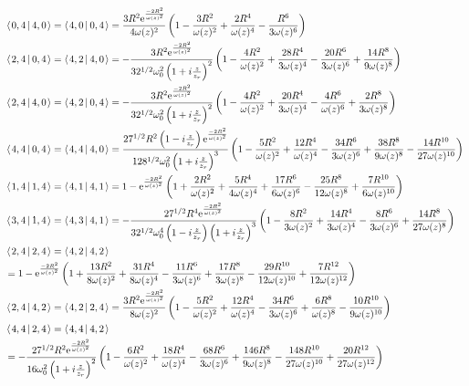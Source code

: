 \documentclass[11pt]{amsart}
\makeatletter
\newcommand{\e}{{\rm e}}				%
\newcommand{\msp}[1]{\mspace{#1mu}}		%
\newcommand{\0}{\varnothing}		%
\newcommand{\brac}[2]{\left\langle\msp{2} #1\left\lvert \msp{3.5} #2 \right.\right\rangle}	%
\newcommand{\1}{!}
\newcommand{\2}{@}
\newcommand{\3}{\#}
\newcommand{\4}{\$}
\newcommand{\5}{\%}
\newcommand{\6}{$^\wedge$}
\newcommand{\7}{\&}
\newcommand{\8}{*}
\newcommand{\9}{(}
\makeatother
\begin{document}
\begin{align*}
&\brac{0,4}{4,0} = \brac{4,0}{0,4} =\frac{3R^2\e^{\frac{-2R^2}{\omega(z)^2}}}{4\omega(z)^2}\left(1-\frac{3R^2}{\omega(z)^2}+\frac{2R^4}{\omega(z)^4}-\frac{R^6}{3\omega(z)^6}\right)
\\
&
\brac{2,4}{0,4} = \brac{4,2}{4,0} = -\frac{3R^2\e^{\frac{-2R^2}{\omega(z)^2}}}{32^{1/2}\omega_0^2\left(1+i\frac{z}{z_r}\right)^2}\left(1-\frac{4R^2}{\omega(z)^2}+\frac{28R^4}{3\omega(z)^4}-\frac{20R^6}{3\omega(z)^6}+\frac{14R^8}{9\omega(z)^8}\right)
\\
&
\brac{2,4}{4,0} = \brac{4,2}{0,4} = -\frac{3R^2\e^{\frac{-2R^2}{\omega(z)^2}}}{32^{1/2}\omega_0^2\left(1+i\frac{z}{z_r}\right)^2}\left(1-\frac{4R^2}{\omega(z)^2}+\frac{20R^4}{3\omega(z)^4}-\frac{4R^6}{\omega(z)^6}+\frac{2R^8}{3\omega(z)^8}\right)
\\
&
\brac{4,4}{0,4} = \brac{4,4}{4,0} = \frac{27^{1/2}R^2\left(1-i\frac{z}{z_r}\right)\e^{\frac{-2R^2}{\omega(z)^2}}}{128^{1/2}\omega_0^2\left(1+i\frac{z}{z_r}\right)^3}\left(1-\frac{5R^2}{\omega(z)^2}+\frac{12R^4}{\omega(z)^4}-\frac{34R^6}{3\omega(z)^6}+\frac{38R^8}{9\omega(z)^8}-\frac{14R^{10}}{27\omega(z)^{10}}\right)
\\
&
\brac{1,4}{1,4} = \brac{4,1}{4,1} = 1-\e^{\frac{-2R^2}{\omega(z)^2}}\left(1+\frac{2R^2}{\omega(z)^2}+\frac{5R^4}{4\omega(z)^4}+\frac{17R^6}{6\omega(z)^6}-\frac{25R^8}{12\omega(z)^8}+\frac{7R^{10}}{6\omega(z)^{10}}\right)
 \\
 &
 \brac{3,4}{1,4} = \brac{4,3}{4,1} = -\frac{27^{1/2}R^4\e^{\frac{-2R^2}{\omega(z)^2}}}{32^{1/2}\omega_0^4\left(1-i\frac{z}{z_r}\right)\left(1+i\frac{z}{z_r}\right)^3}\left(1-\frac{8R^2}{3\omega(z)^2}+\frac{14R^4}{3\omega(z)^4}-\frac{8R^6}{3\omega(z)^6}+\frac{14R^8}{27\omega(z)^8}\right)
 \\
 &
 \brac{2,4}{2,4} = \brac{4,2}{4,2} 
 \\
 &
 =1-\e^{\frac{-2R^2}{\omega(z)^2}}\left(1+\frac{13R^2}{8\omega(z)^2}+\frac{31R^4}{8\omega(z)^4}-\frac{11R^6}{3\omega(z)^6}+\frac{17R^8}{3\omega(z)^8}-\frac{29R^{10}}{12\omega(z)^{10}}+\frac{7R^{12}}{12\omega(z)^{12}}\right)
 \\
 &
 \brac{2,4}{4,2} = \brac{4,2}{2,4} = \frac{3R^2\e^{\frac{-2R^2}{\omega(z)^2}}}{8\omega(z)^2}\left(1-\frac{5R^2}{\omega(z)^2}+\frac{12R^4}{\omega(z)^4}-\frac{34R^6}{3\omega(z)^6}+\frac{6R^8}{\omega(z)^8}-\frac{10R^{10}}{9\omega(z)^{10}}\right)
 \\
 &
 \brac{4,4}{2,4} = \brac{4,4}{4,2} 
 \\
 &
 = -\frac{27^{1/2}R^2\e^{\frac{-2R^2}{\omega(z)^2}}}{16\omega_0^2\left(1+i\frac{z}{z_r}\right)^2}\left(1-\frac{6R^2}{\omega(z)^2}+\frac{18R^4}{\omega(z)^4}-\frac{68R^6}{3\omega(z)^6}+\frac{146R^8}{9\omega(z)^8}-\frac{148R^{10}}{27\omega(z)^{10}}+\frac{20R^{12}}{27\omega(z)^{12}}\right)

\end{align*}
\end{document}

